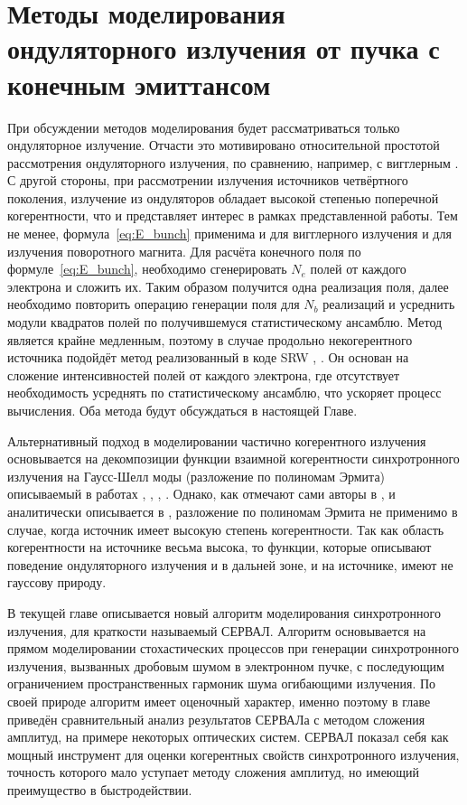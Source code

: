 
\chapter{Методы моделирования ондуляторного излучения от пучка с конечным эмиттансом} \label{chapt2}
При обсуждении методов моделирования будет рассматриваться только ондуляторное излучение. Отчасти это мотивировано относительной простотой рассмотрения ондуляторного излучения, по сравнению, например, с вигглерным \cite{geloni_brightness_2014}. С другой стороны, при рассмотрении излучения источников четвёртного поколения, излучение из ондуляторов обладает высокой степенью поперечной когерентности, что и представляет интерес в рамках представленной работы. Тем не менее, формула~\ref{eq:E_bunch} применима и для вигглерного излучения и для излучения поворотного магнита. Для расчёта конечного поля по формуле~\ref{eq:E_bunch}, необходимо сгенерировать $N_e$ полей от каждого электрона и сложить их. Таким образом получится одна реализация поля, далее необходимо повторить операцию генерации поля для $N_b$ реализаций и усреднить модули квадратов полей по получившемуся статистическому ансамблю. Метод является крайне медленным, поэтому в случае продольно некогерентного источника подойдёт метод реализованный в коде SRW \cite{chubar_accurate_1998}, \cite{chubar_simulation_2006}. Он основан на сложение интенсивностей полей от каждого электрона, где отсутствует необходимость усреднять по статистическому ансамблю, что ускоряет процесс вычисления. Оба метода будут обсуждаться в настоящей Главе. 

Альтернативный подход в моделировании частично когерентного излучения основывается на декомпозиции функции взаимной когерентности синхротронного излучения на Гаусс-Шелл моды (разложение по полиномам Эрмита) описываемый в работах \cite{singer_modelling_2011}, \cite{hua_application_2012}, \cite{khubbutdinov_coherence_2019}, \cite{noauthor_iucr_nodate}. Однако, как отмечают сами авторы в \cite{khubbutdinov_coherence_2019}, \cite{noauthor_iucr_nodate} и аналитически описывается в \cite{geloni_transverse_2008}, разложение по полиномам Эрмита не применимо в случае, когда источник имеет высокую степень когерентности. Так как область когерентности на источнике весьма высока, то функции, которые описывают поведение ондуляторного излучения и в дальней зоне, и на источнике, имеют не гауссову природу.

В текущей главе описывается новый алгоритм моделирования синхротронного излучения, для краткости называемый СЕРВАЛ. Алгоритм основывается на прямом моделировании стохастических процессов при генерации синхротронного излучения, вызванных дробовым шумом в электронном пучке, с последующим ограничением пространственных гармоник шума огибающими излучения. По своей природе алгоритм имеет оценочный характер, именно поэтому в главе приведён сравнительный анализ результатов СЕРВАЛа с методом сложения амплитуд, на примере некоторых оптических систем. СЕРВАЛ показал себя как мощный инструмент для оценки когерентных свойств синхротронного излучения, точность которого мало уступает методу сложения амплитуд, но имеющий преимущество в быстродействии. 
